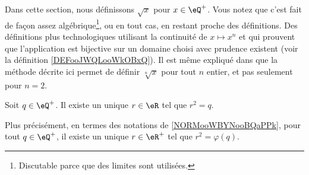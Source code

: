 Dans cette section, nous définissons \( \sqrt{ x }\) pour \( x\in\eQ^+\). Vous notez que c'est fait de façon assez algébrique\footnote{Discutable parce que des limites sont utilisées.}, ou en tout cas, en restant proche des définitions. Des définitions plus technologiques utilisant la continuité de \( x\mapsto x^n\) et qui prouvent que l'application est bijective sur un domaine choisi avec prudence existent (voir la définition \ref{DEFooJWQLooWkOBxQ}). Il est même expliqué dans \cite{BIBooMPXEooQLKhku} que la méthode décrite ici permet de définir \( \sqrt[n]{ x }\) pour tout \( n\) entier, et pas seulement pour \( n=2\).

\begin{proposition}     \label{PROPooUHKFooVKmpte}
	Soit \( q\in \eQ^+\). Il existe un unique \( r\in \eR\) tel que \( r^2=q\).

	Plus précisément, en termes des notations de \ref{NORMooWBYNooBQaPPk}, pour tout \( q\in \eQ^+\), il existe un unique \( r\in \eR^+\) tel que \( r^2=\varphi(q)\).
\end{proposition}

